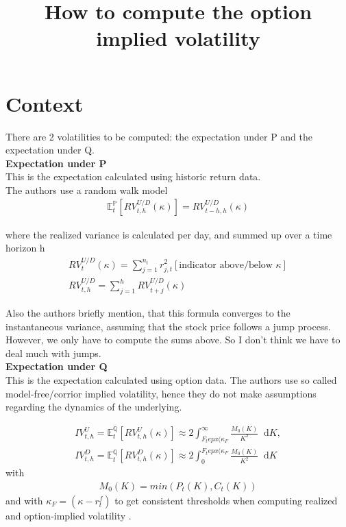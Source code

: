 \documentclass{article}
\title{How to compute the option implied volatility}
\newcommand*\diff{\mathop{}\!\mathrm{d}}
\begin{document}
\maketitle

\section{Context}\label{sec:1}

There are 2 volatilities to be computed: the expectation under P and the expectation under Q.\\

\textbf{Expectation under P}\\
This is the expectation calculated using historic return data.\\

The authors use a random walk model 
\begin{align}\label{eq:Ex_p}
\mathbb{E}_{t}^{\mathbb{P}} \left[ RV_{t,h}^{U/D} (\kappa) \right] = RV_{t-h,h}^{U/D}(\kappa)
\end{align}

where the realized variance is calculated per day, and summed up over a time horizon h
\begin{align}\label{eq:RV_p}
RV_{t}^{U/D}(\kappa) = \sum_{j=1}^{n_{t}} r_{j,t}^{2} [\text{indicator above/below $\kappa$}]\\
RV_{t,h}^{U/D} = \sum_{j=1}^{h} RV_{t+j}^{U/D}(\kappa)
\end{align}

Also the authors briefly mention, that this formula converges to the instantaneous variance, assuming that the stock price follows a jump process. However, we only have to compute the sums above. So I don't think we have to deal much with jumps.\\

\textbf{Expectation under Q}\\
This is the expectation calculated using option data. The authors use so called model-free/corrior implied volatility, hence they do not make assumptions regarding the dynamics of the underlying.

\begin{align}\label{eq:Ex_q}
IV_{t,h}^{U} = \mathbb{E}_{t}^{\mathbb{Q}} \left[ RV_{t,h}^{U} (\kappa) \right] \approx 2 \int_{F_{t}epx(\kappa_{F}}^{\infty} \frac{M_{0}(K)}{K^{2}} \diff K,\\

IV_{t,h}^{D} = \mathbb{E}_{t}^{\mathbb{Q}} \left[ RV_{t,h}^{D} (\kappa) \right] \approx 2 \int_{0}^{F_{t}epx(\kappa_{F}} \frac{M_{0}(K)}{K^{2}} \diff K
\end{align}
with
\begin{align*}
M_{0}(K) = min(P_{t}(K), C_{t}(K))
\end{align*}
and with $\kappa_{F} = (\kappa - r_{t}^{f})$ to get consistent thresholds when computing realized and option-implied volatility .\\
\end{document}
